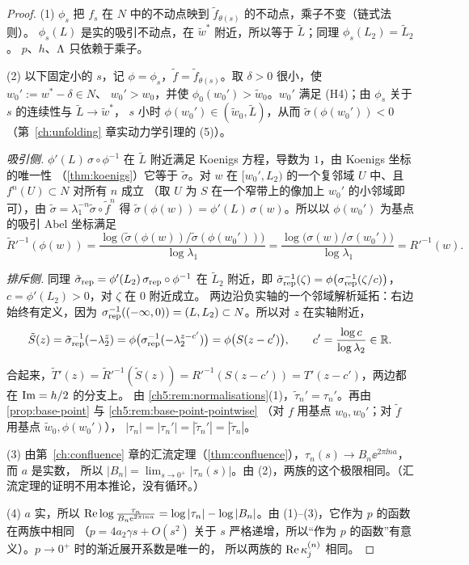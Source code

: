 \begin{proof}
(1) $\phi_s$ 把 $f_s$ 在 $N$ 中的不动点映到 $\tilde f_{\theta(s)}$ 的不动点，乘子不变（链式法则）。
$\phi_s(L)$ 是实的吸引不动点，在 $\tilde w^*$ 附近，所以等于 $\tilde L$；同理 $\phi_s(L_2)=\tilde L_2$。
$p$、$h$、$\Lambda$ 只依赖于乘子。

(2) 以下固定小的 $s$，记 $\phi=\phi_s$，$\tilde f=\tilde f_{\theta(s)}$。取 $\delta>0$ 很小，使 $w_0':=w^*-\delta\in N$、
$w_0'>w_0$，并使 $\phi_0(w_0')>\tilde w_0$。$w_0'$ 满足 (H4)；由 $\phi_s$ 关于 $s$ 的连续性与 $\tilde L\to\tilde w^*$，
$s$ 小时 $\phi(w_0')\in(\tilde w_0,\tilde L)$，从而 $\tilde\sigma(\phi(w_0'))<0$（第~\ref{ch:unfolding} 章实动力学引理的 (5)）。

\emph{吸引侧.} $\phi'(L)\,\sigma\circ\phi^{-1}$ 在 $\tilde L$ 附近满足 Koenigs 方程，导数为 $1$，由 Koenigs 坐标的唯一性
（\cref{thm:koenigs}）它等于 $\tilde\sigma$。对 $w$ 在 $[w_0',L_2)$ 的一个复邻域 $U$ 中、且 $f^n(U)\subset N$ 对所有 $n$ 成立
（取 $U$ 为 $S$ 在一个窄带上的像加上 $w_0'$ 的小邻域即可），由 $\tilde\sigma=\lambda_1^{-n}\tilde\sigma\circ\tilde f^n$ 得
$\tilde\sigma(\phi(w))=\phi'(L)\,\sigma(w)$。所以以 $\phi(w_0')$ 为基点的吸引 Abel 坐标满足
\[
 \tilde R'^{-1}(\phi(w))=\frac{\log\bigl(\tilde\sigma(\phi(w))/\tilde\sigma(\phi(w_0'))\bigr)}{\log\lambda_1}
 =\frac{\log\bigl(\sigma(w)/\sigma(w_0')\bigr)}{\log\lambda_1}=R'^{-1}(w).
\]

\emph{排斥侧.} 同理 $\tilde\sigma_{\rm rep}=\phi'(L_2)\,\sigma_{\rm rep}\circ\phi^{-1}$ 在 $\tilde L_2$ 附近，即
$\tilde\sigma_{\rm rep}^{-1}(\zeta)=\phi\bigl(\sigma_{\rm rep}^{-1}(\zeta/c)\bigr)$，$c=\phi'(L_2)>0$，对 $\zeta$ 在 $0$ 附近成立。
两边沿负实轴的一个邻域解析延拓：右边始终有定义，因为 $\sigma_{\rm rep}^{-1}((-\infty,0))=(L,L_2)\subset N$。所以对 $z$ 在实轴附近，
\[
 \tilde S(z)=\tilde\sigma_{\rm rep}^{-1}(-\lambda_2^z)=\phi\bigl(\sigma_{\rm rep}^{-1}(-\lambda_2^{z-c'})\bigr)=\phi\bigl(S(z-c')\bigr),
 \qquad c'=\frac{\log c}{\log\lambda_2}\in\mathbb{R} .
\]

合起来，$\tilde T'(z)=\tilde R'^{-1}(\tilde S(z))=R'^{-1}(S(z-c'))=T'(z-c')$，两边都在 $\operatorname{Im}=h/2$ 的分支上。
由 \cref{ch5:rem:normalisations}(1)，$\tilde\tau_n'=\tau_n'$。再由 \cref{prop:base-point} 与 \cref{ch5:rem:base-point-pointwise}
（对 $f$ 用基点 $w_0,w_0'$；对 $\tilde f$ 用基点 $\tilde w_0,\phi(w_0')$），
$|\tau_n|=|\tau_n'|=|\tilde\tau_n'|=|\tilde\tau_n|$。

(3) 由第~\ref{ch:confluence} 章的汇流定理（\cref{thm:confluence}），$\tau_n(s)\to B_n\ee^{2\pi\ii na}$，而 $a$ 是实数，
所以 $|B_n|=\lim_{s\to0^+}|\tau_n(s)|$。由 (2)，两族的这个极限相同。（汇流定理的证明不用本推论，没有循环。）

(4) $a$ 实，所以 $\operatorname{Re}\log\frac{\tau_n}{B_n\mathrm{e}^{2\pi\mathrm{i} na}}=\log|\tau_n|-\log|B_n|$。由 (1)--(3)，它作为 $p$ 的函数在两族中相同
（$p=4a_2\gamma s+O(s^2)$ 关于 $s$ 严格递增，所以``作为 $p$ 的函数''有意义）。$p\to0^+$ 时的渐近展开系数是唯一的，
所以两族的 $\operatorname{Re}\kappa^{(n)}_j$ 相同。
\end{proof}

